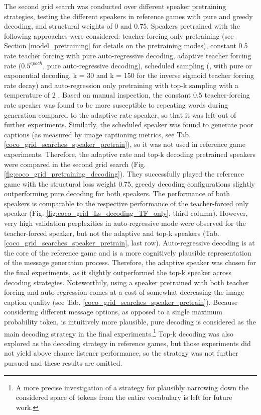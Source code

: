 The second grid search was conducted over different speaker pretraining strategies, testing the different speakers in reference games with pure and greedy decoding, and structural weights of 0 and 0.75. Speakers pretrained with the following approaches were considered: teacher forcing only pretraining (see Section \ref{model_pretraining} for details on the pretraining modes), constant 0.5 rate teacher forcing with pure auto-regressive decoding, adaptive teacher forcing rate ($0.5^{epoch}$, pure auto-regressive decoding), scheduled sampling (\cite{bengio2015scheduled}, with pure or exponential decoding, k = 30 and k = 150 for the inverse sigmoid teacher forcing rate decay) and auto-regression only pretraining with top-k sampling with a temperature of 2 \parencite[following][]{lazaridou2020multi}.
Based on manual inspection, the constant 0.5 teacher-forcing rate speaker was found to be more susceptible to repeating words during generation compared to the adaptive rate speaker, so that it was left out of further experiments. Similarly, the scheduled speaker was found to generate poor captions (as measured by image captioning metrics, see Tab. \ref{coco_grid_searches_speaker_pretrain}), so it was not used in reference game experiments. 
Therefore, the adaptive rate and top-k decoding pretrained speakers were compared in the second grid search (Fig. \ref{fig:coco_grid_pretraining_decoding}). 
They successfully played the reference game with the structural loss weight 0.75, greedy decoding configurations slightly outperforming pure decoding for both speakers. The performance of both speakers is comparable to the respective performance of the teacher-forced only speaker (Fig. \ref{fig:coco_grid_Ls_decoding_TF_only}, third column). However, very high validation perplexities in auto-regressive mode were observed for the teacher-forced speaker, but not the adaptive  and top-k speakers (Tab. \ref{coco_grid_searches_speaker_pretrain}, last row). Auto-regressive decoding is at the core of the reference game and is a more cognitively plausible representation of the message generation process. Therefore, the adaptive speaker was chosen for the final experiments, as it slightly outperformed the top-k speaker across decoding strategies. Noteworthily, using a speaker pretrained with both teacher forcing and auto-regression comes at a cost of somewhat decreasing the image caption quality (see Tab. \ref{coco_grid_searches_speaker_pretrain}).
Because considering different message options, as opposed to a single maximum probability token, is intuitively more plausible, pure decoding is considered as the main decoding strategy in the final experiments.\footnote{A more precise investigation of a strategy for plausibly narrowing down the considered space of tokens from the entire vocabulary is left for future work.} Top-k decoding was also explored as the decoding strategy in reference games, but those experiments did not yield above chance listener performance, so the strategy was not further pursued and these results are omitted.

